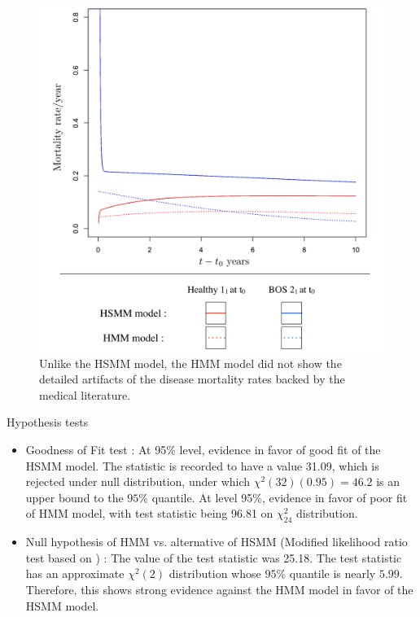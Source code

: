 \documentclass{beamer}
\begin{document}
\begin{frame}
\begin{figure}
\centering
\includegraphics[scale=0.25]{mortcomp_hsmmhmm.pdf}
\caption{Unlike the HSMM model, the HMM model did not show the detailed artifacts of the disease mortality rates backed by the medical literature.}
\end{figure}
\end{frame}
\begin{frame}{Hypothesis tests}
\begin{itemize}
\item Goodness of Fit test \citep{titman2008general} : At 95\% level, evidence in favor of good fit of the HSMM model. The statistic is recorded to have a value 31.09, which is rejected under null distribution, under which $\chi^2(32) (0.95)=46.2$ is an upper bound to the $95\%$ quantile. At level 95\%, evidence in favor of poor fit of HMM model, with test statistic being 96.81 on $\chi^2_{24}$ distribution.
\item Null hypothesis of HMM vs. alternative of HSMM (Modified likelihood ratio test based on \cite{chen2001modified}) : The value of the test statistic was 25.18. The test statistic has an approximate $\chi^2(2)$ distribution whose $95\%$ quantile is nearly $5.99$. Therefore, this shows strong evidence against the HMM model in favor of the HSMM model.
\end{itemize}
\end{frame}
\end{document}
